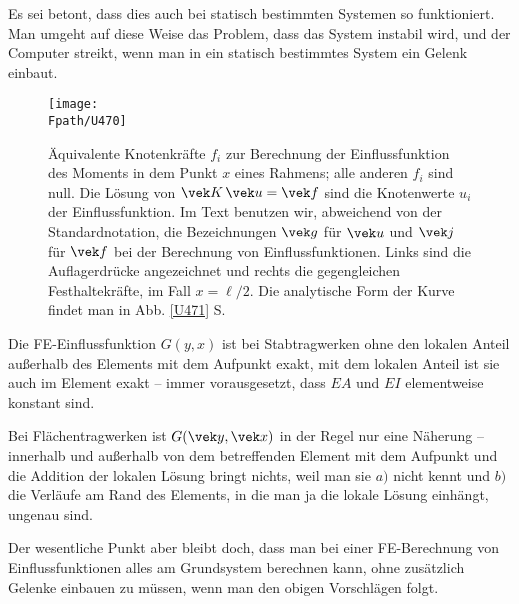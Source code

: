{{{{{Es sei betont, dass dies auch bei statisch bestimmten Systemen so funktioniert. Man umgeht auf diese Weise das Problem, dass das System instabil wird, und der Computer streikt, wenn man in ein statisch bestimmtes System ein Gelenk einbaut.
\begin{figure}
\centering
\if {} \sidecaption[t] \fi
{\texttt{[image: \\Fpath/U470]}}
\caption{\"{A}quivalente Knotenkr\"{a}fte $f_i$ zur Berechnung der Einflussfunktion des Moments in dem Punkt $x$ eines Rahmens; alle anderen $f_i$ sind null. Die L\"{o}sung von $\vek K\,\vek u = \vek f$ sind die Knotenwerte $u_i$ der Einflussfunktion. Im Text benutzen wir, abweichend von der Standardnotation, die Bezeichnungen $\vek g$ f\"{u}r $\vek u$ und $\vek j$ f\"{u}r $\vek f$ bei der Berechnung von Einflussfunktionen. Links sind die Auflagerdr\"{u}cke angezeichnet und rechts die gegengleichen Festhaltekr\"{a}fte, im Fall $x = \ell/2$. Die analytische Form der Kurve findet man in  Abb. \ref{U471} S. \pageref{U471} }
\label{U470}%
\end{figure}%
Die FE-Einflussfunktion $G(y,x)$ ist bei Stabtragwerken ohne den lokalen Anteil au{\ss}erhalb des Elements mit dem Aufpunkt exakt, mit dem lokalen Anteil ist sie auch im Element exakt -- immer vorausgesetzt, dass $EA$ und $EI$ elementweise konstant sind.

Bei Fl\"{a}chentragwerken ist $G(\vek y,\vek x)$ in der Regel nur eine N\"{a}herung -- innerhalb und au{\ss}erhalb von dem betreffenden Element mit dem Aufpunkt und die Addition der lokalen L\"{o}sung bringt nichts, weil man sie $a)$ nicht kennt und $b)$ die Verl\"{a}ufe am Rand des Elements, in die man ja die lokale L\"{o}sung \glq einh\"{a}ngt\grq{}, ungenau sind.

Der wesentliche Punkt aber bleibt doch, dass man bei einer FE-Berechnung von Einflussfunktionen alles am Grundsystem berechnen kann, ohne zus\"{a}tzlich Gelenke einbauen zu m\"{u}ssen, wenn man den obigen Vorschl\"{a}gen folgt.


}}}}}
